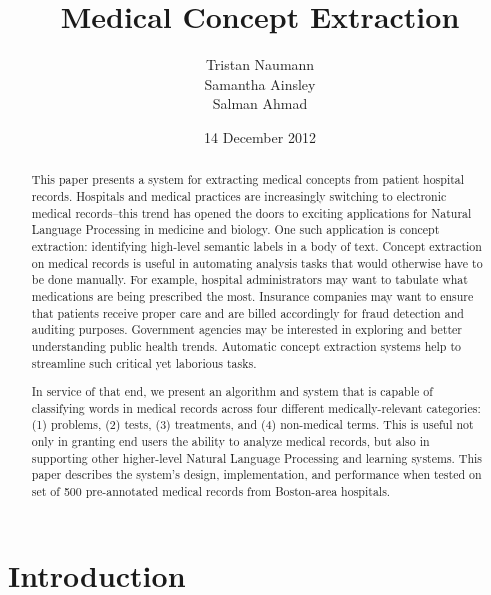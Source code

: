 \documentclass[preprint]{style}
\begin{document}
\title{Medical Concept Extraction}

\author{
\alignauthor
Tristan Naumann\\
\alignauthor
Samantha Ainsley\\
\alignauthor
Salman Ahmad\\
}

\date{14 December 2012}

\maketitle
\begin{abstract}

This paper presents a system for extracting medical concepts from patient hospital records. Hospitals and medical practices are increasingly switching to electronic medical records--this trend has opened the doors to exciting applications for Natural Language Processing in medicine and biology. One such application is concept extraction: identifying high-level semantic labels in a body of text. Concept extraction on medical records is useful in automating analysis tasks that would otherwise have to be done manually. For example, hospital administrators may want to tabulate what medications are being prescribed the most. Insurance companies may want to ensure that patients receive proper care and are billed accordingly for fraud detection and auditing purposes. Government agencies may be interested in exploring and better understanding public health trends. Automatic concept extraction systems help to streamline such critical yet laborious tasks.

In service of that end, we present an algorithm and system that is capable of classifying words in medical records across four different medically-relevant categories: (1) problems, (2) tests, (3) treatments, and (4) non-medical terms. This is useful not only in granting end users the ability to analyze medical records, but also in supporting other higher-level Natural Language Processing and learning systems. This paper describes the system's design, implementation, and performance when tested on set of 500 pre-annotated medical records from Boston-area hospitals.


\end{abstract}

\section{Introduction}
\end{document}
